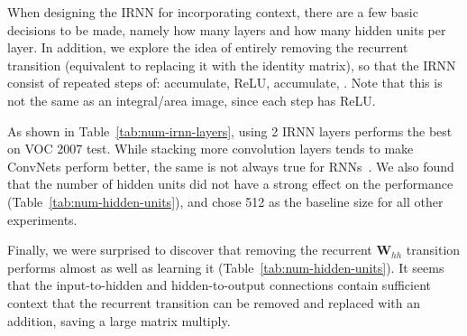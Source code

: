 \documentclass[10pt,twocolumn,letterpaper]{article}
\begin{document}
When designing the IRNN for incorporating context, there are a few basic decisions
to be made, namely how many layers and how many hidden units per layer.
In addition, we explore the idea of entirely removing the recurrent transition
(equivalent to replacing it with the identity matrix), so that
the IRNN consist of repeated steps of: accumulate, ReLU, accumulate, \etc.
Note that this is not the same as an integral/area image, since each step has
ReLU.

As shown in Table~\ref{tab:num-irnn-layers}, using 2 IRNN layers performs the
best on VOC 2007 test.  While stacking more convolution layers tends to make
ConvNets perform better, the same is not always true for
RNNs~\cite{karpathy15rnn}.
We also found that the number of hidden units did not have a strong effect on
the performance (Table~\ref{tab:num-hidden-units}), and chose 512 as the
baseline size for all other experiments.

Finally, we were surprised to discover that removing the recurrent
$\mathbf{W}_{hh}$ transition performs almost as well as learning it
(Table~\ref{tab:num-hidden-units}).  It seems that the input-to-hidden and
hidden-to-output connections contain sufficient context that the
recurrent transition can be removed and replaced with an addition,
saving a large matrix multiply.
\end{document}
